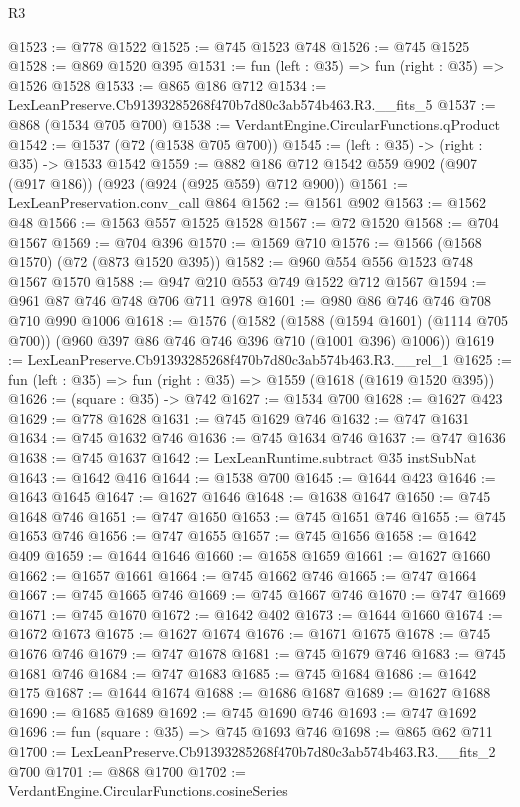 \begin{lexlean}{R3}
\begin{coremodule}
@1523 := @778 @1522
@1525 := @745 @1523 @748
@1526 := @745 @1525
@1528 := @869 @1520 @395
@1531 := fun (left : @35) => fun (right : @35) => @1526 @1528
@1533 := @865 @186 @712
@1534 := LexLeanPreserve.Cb91393285268f470b7d80c3ab574b463.R3.__fits_5
@1537 := @868 (@1534 @705 @700)
@1538 := VerdantEngine.CircularFunctions.qProduct
@1542 := @1537 (@72 (@1538 @705 @700))
@1545 := (left : @35) -> (right : @35) -> @1533 @1542
@1559 := @882 @186 @712 @1542 @559 @902 (@907 (@917 @186)) (@923 (@924 (@925 @559) @712 @900))
@1561 := LexLeanPreservation.conv_call @864
@1562 := @1561 @902
@1563 := @1562 @48
@1566 := @1563 @557 @1525 @1528
@1567 := @72 @1520
@1568 := @704 @1567
@1569 := @704 @396
@1570 := @1569 @710
@1576 := @1566 (@1568 @1570) (@72 (@873 @1520 @395))
@1582 := @960 @554 @556 @1523 @748 @1567 @1570
@1588 := @947 @210 @553 @749 @1522 @712 @1567
@1594 := @961 @87 @746 @748 @706 @711 @978
@1601 := @980 @86 @746 @746 @708 @710 @990 @1006
@1618 := @1576
    (@1582
      (@1588 (@1594 @1601) (@1114 @705 @700))
      (@960 @397 @86 @746 @746 @396 @710 (@1001 @396) @1006))
@1619 := LexLeanPreserve.Cb91393285268f470b7d80c3ab574b463.R3.__rel_1
@1625 := fun (left : @35) => fun (right : @35) => @1559 (@1618 (@1619 @1520 @395))
@1626 := (square : @35) -> @742
@1627 := @1534 @700
@1628 := @1627 @423
@1629 := @778 @1628
@1631 := @745 @1629 @746
@1632 := @747 @1631
@1634 := @745 @1632 @746
@1636 := @745 @1634 @746
@1637 := @747 @1636
@1638 := @745 @1637
@1642 := LexLeanRuntime.subtract @35 instSubNat
@1643 := @1642 @416
@1644 := @1538 @700
@1645 := @1644 @423
@1646 := @1643 @1645
@1647 := @1627 @1646
@1648 := @1638 @1647
@1650 := @745 @1648 @746
@1651 := @747 @1650
@1653 := @745 @1651 @746
@1655 := @745 @1653 @746
@1656 := @747 @1655
@1657 := @745 @1656
@1658 := @1642 @409
@1659 := @1644 @1646
@1660 := @1658 @1659
@1661 := @1627 @1660
@1662 := @1657 @1661
@1664 := @745 @1662 @746
@1665 := @747 @1664
@1667 := @745 @1665 @746
@1669 := @745 @1667 @746
@1670 := @747 @1669
@1671 := @745 @1670
@1672 := @1642 @402
@1673 := @1644 @1660
@1674 := @1672 @1673
@1675 := @1627 @1674
@1676 := @1671 @1675
@1678 := @745 @1676 @746
@1679 := @747 @1678
@1681 := @745 @1679 @746
@1683 := @745 @1681 @746
@1684 := @747 @1683
@1685 := @745 @1684
@1686 := @1642 @175
@1687 := @1644 @1674
@1688 := @1686 @1687
@1689 := @1627 @1688
@1690 := @1685 @1689
@1692 := @745 @1690 @746
@1693 := @747 @1692
@1696 := fun (square : @35) => @745 @1693 @746
@1698 := @865 @62 @711
@1700 := LexLeanPreserve.Cb91393285268f470b7d80c3ab574b463.R3.__fits_2 @700
@1701 := @868 @1700
@1702 := VerdantEngine.CircularFunctions.cosineSeries

\end{coremodule}
\end{lexlean}
